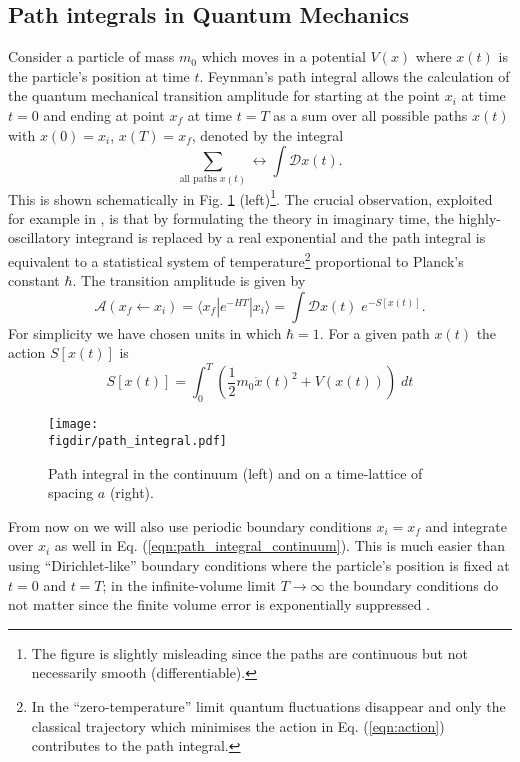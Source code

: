 \documentclass[11pt]{article}
\newcommand{\figdir}{./figures/}
\begin{document}
\subsection{Path integrals in Quantum Mechanics}
Consider a particle of mass $m_0$ which moves in a potential $V(x)$ where $x(t)$ is the particle's position at time $t$.
Feynman's path integral \cite{Feynman2010} allows the calculation of the quantum mechanical transition amplitude for starting at the point $x_i$ at time $t=0$ and ending at point $x_f$ at time $t=T$ as a sum over all possible paths $x(t)$ with $x(0)=x_i$,  $x(T)=x_f$, denoted by the integral
\begin{equation} 
\sum_{\text{all paths $x(t)$}}\leftrightarrow  \int \mathcal{D}x(t).
\end{equation}
This is shown schematically in Fig. \ref{fig:path_integral} (left)\footnote{The figure is slightly misleading since the paths are continuous but not necessarily smooth (differentiable).}. The crucial observation, exploited for example in \cite{Creutz1981}, is that by formulating the theory in imaginary time, the highly-oscillatory integrand is replaced by a real exponential and the path integral is equivalent to a statistical system of temperature\footnote{In the ``zero-temperature'' limit quantum fluctuations disappear and only the classical trajectory which minimises the action in Eq. (\ref{eqn:action}) contributes to the path integral.} proportional to Planck's constant $\hbar$.  The transition amplitude is given by
\begin{equation}
  \mathcal{A}(x_f\leftarrow x_i)=\langle x_f| e^{-HT} |x_i\rangle = \int\mathcal{D}x(t)\;e^{-S[x(t)]}.\label{eqn:path_integral_continuum}
\end{equation}
For simplicity we have chosen units in which $\hbar=1$.
For a given path $x(t)$ the action $S[x(t)]$ is
\begin{equation}
  S[x(t)] = \int_{0}^{T} \left(\frac{1}{2}m_0 \dot{x}(t)^2 + V(x(t))\right)\;dt\label{eqn:action}
\end{equation}
\begin{figure}
  \begin{center}
    \texttt{[image: \\figdir/path\_integral.pdf]}
    \caption{Path integral in the continuum (left) and on a time-lattice of spacing $a$ (right).}
    \label{fig:path_integral}
  \end{center}
\end{figure}
From now on we will also use periodic boundary conditions $x_i=x_f$ and integrate over $x_i$ as well in Eq. (\ref{eqn:path_integral_continuum}). This is much easier than using ``Dirichlet-like'' boundary conditions where the particle's position is fixed at $t=0$ and $t=T$; in the infinite-volume limit $T\rightarrow \infty$ the boundary conditions do not matter since the finite volume error is exponentially suppressed \cite{Lepage1994}.
\end{document}
